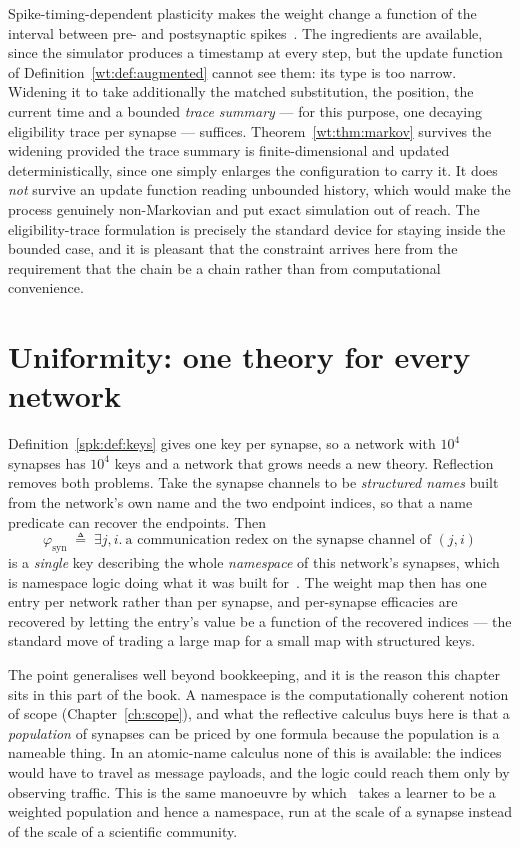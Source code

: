 \begin{remark}
\label{spk:rmk:stdp}
Spike-timing-dependent plasticity makes the weight change a function of the interval
between pre- and postsynaptic spikes~\cite{stdp}. The ingredients are available, since
the simulator produces a timestamp at every step, but the update function of
Definition~\ref{wt:def:augmented} cannot see them: its type is too narrow. Widening it to
take additionally the matched substitution, the position, the current time and a bounded
\emph{trace summary} --- for this purpose, one decaying eligibility trace per synapse ---
suffices. Theorem~\ref{wt:thm:markov} survives the widening provided the trace summary is
finite-dimensional and updated deterministically, since one simply enlarges the
configuration to carry it. It does \emph{not} survive an update function reading unbounded
history, which would make the process genuinely non-Markovian and put exact simulation out
of reach. The eligibility-trace formulation is precisely the standard device for staying
inside the bounded case, and it is pleasant that the constraint arrives here from the
requirement that the chain be a chain rather than from computational convenience.
\end{remark}

\section{Uniformity: one theory for every network}
\label{spk:sec:uniform}

Definition~\ref{spk:def:keys} gives one key per synapse, so a network with $10^4$
synapses has $10^4$ keys and a network that grows needs a new theory. Reflection removes
both problems. Take the synapse channels to be \emph{structured names} built from the
network's own name and the two endpoint indices, so that a name predicate can recover the
endpoints. Then
\[
  \varphi_{\mathrm{syn}} \;\triangleq\;
  \exists j, i.\ \text{a communication redex on the synapse channel of } (j,i)
\]
is a \emph{single} key describing the whole \emph{namespace} of this network's synapses,
which is namespace logic doing what it was built for~\cite{NamespaceLogic}. The weight map
then has one entry per network rather than per synapse, and per-synapse efficacies are
recovered by letting the entry's value be a function of the recovered indices --- the
standard move of trading a large map for a small map with structured keys.

The point generalises well beyond bookkeeping, and it is the reason this chapter sits in
this part of the book. A namespace is the computationally coherent notion of scope
(Chapter~\ref{ch:scope}), and what the reflective calculus buys here is that a
\emph{population} of synapses can be priced by one formula because the population is a
nameable thing. In an atomic-name calculus none of this is available: the indices would
have to travel as message payloads, and the logic could reach them only by observing
traffic. This is the same manoeuvre by which \chComp\ takes a learner to be a weighted
population and hence a namespace, run at the scale of a synapse instead of the scale of a
scientific community.

